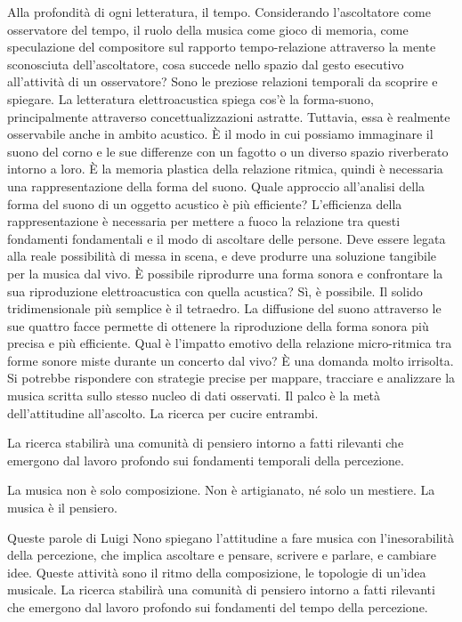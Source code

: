 \documentclass[a4paper,11pt]{article}
\begin{document}
Alla profondità di ogni letteratura, il tempo. Considerando
l'ascoltatore come osservatore del tempo, il ruolo della musica come
gioco di memoria, come speculazione del compositore sul rapporto
tempo-relazione attraverso la mente sconosciuta dell'ascoltatore, cosa
succede nello spazio dal gesto esecutivo all'attività di un osservatore?
Sono le preziose relazioni temporali da scoprire e spiegare. La
letteratura elettroacustica spiega cos'è la forma-suono, principalmente
attraverso concettualizzazioni astratte. Tuttavia, essa è realmente
osservabile anche in ambito acustico. È il modo in cui possiamo
immaginare il suono del corno e le sue differenze con un fagotto o un
diverso spazio riverberato intorno a loro. È la memoria plastica della
relazione ritmica, quindi è necessaria una rappresentazione della forma
del suono. Quale approccio all'analisi della forma del suono di un
oggetto acustico è più efficiente? L'efficienza della rappresentazione è
necessaria per mettere a fuoco la relazione tra questi fondamenti
fondamentali e il modo di ascoltare delle persone. Deve essere legata
alla reale possibilità di messa in scena, e deve produrre una soluzione
tangibile per la musica dal vivo. È possibile riprodurre una forma
sonora e confrontare la sua riproduzione elettroacustica con quella
acustica? Sì, è possibile. Il solido tridimensionale più semplice è il
tetraedro. La diffusione del suono attraverso le sue quattro facce
permette di ottenere la riproduzione della forma sonora più precisa e
più efficiente. Qual è l'impatto emotivo della relazione micro-ritmica
tra forme sonore miste durante un concerto dal vivo? È una domanda molto
irrisolta. Si potrebbe rispondere con strategie precise per mappare,
tracciare e analizzare la musica scritta sullo stesso nucleo di dati
osservati. Il palco è la metà dell'attitudine all'ascolto. La ricerca
per cucire entrambi.

La ricerca stabilirà una comunità di pensiero intorno a fatti rilevanti
che emergono dal lavoro profondo sui fondamenti temporali della
percezione.

La musica non è solo composizione. Non è artigianato, né solo un
mestiere. La musica è il pensiero.

Queste parole di Luigi Nono spiegano l'attitudine a fare musica con
l'inesorabilità della percezione, che implica ascoltare e pensare,
scrivere e parlare, e cambiare idee. Queste attività sono il ritmo della
composizione, le topologie di un'idea musicale. La ricerca stabilirà una
comunità di pensiero intorno a fatti rilevanti che emergono dal lavoro
profondo sui fondamenti del tempo della percezione.
\end{document}
